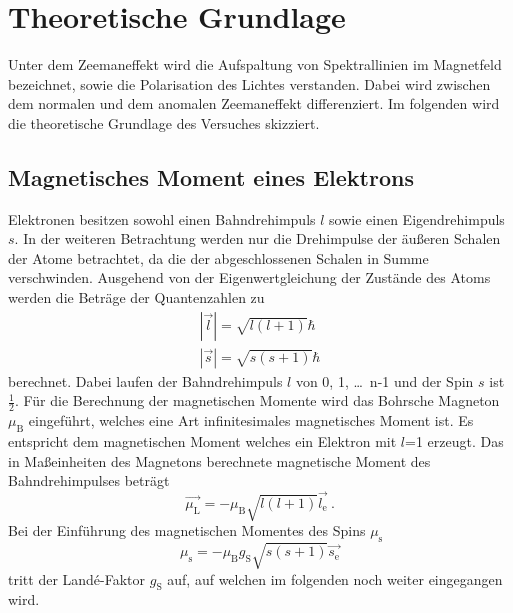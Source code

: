 \section{Theoretische Grundlage}
\label{sec:Theorie}
Unter dem Zeemaneffekt wird die Aufspaltung von Spektrallinien im Magnetfeld bezeichnet, sowie die Polarisation des Lichtes verstanden. Dabei wird zwischen dem normalen und dem anomalen Zeemaneffekt differenziert. Im folgenden wird die theoretische Grundlage des Versuches skizziert.

\subsection{Magnetisches Moment eines Elektrons}
Elektronen besitzen sowohl einen Bahndrehimpuls $l$ sowie einen Eigendrehimpuls $s$. In der weiteren Betrachtung werden nur die Drehimpulse der äußeren Schalen der Atome betrachtet, da die der abgeschlossenen Schalen in Summe verschwinden. Ausgehend von der Eigenwertgleichung der Zustände des Atoms werden die Beträge der Quantenzahlen zu
\begin{eqnarray}
  |\vec{l}| = \sqrt{l(l+1)} \hbar  \\
  |\vec{s}| = \sqrt{s(s+1)} \hbar
  \label{eqn:betQua}
\end{eqnarray}
berechnet. Dabei laufen der Bahndrehimpuls $l$ von 0, 1, \ldots $\,$ n-1 und der Spin $s$ ist $\frac{1}{2}$. Für die Berechnung der magnetischen Momente wird das Bohrsche Magneton $\mu_\text{B}$ eingeführt, welches eine Art infinitesimales magnetisches Moment ist. Es entspricht dem magnetischen Moment welches ein Elektron mit $l$=1 erzeugt. Das in Maßeinheiten des Magnetons berechnete magnetische Moment des Bahndrehimpulses beträgt
\begin{equation}
  \vec{\mu_\text{L}} = -\mu_\text{B} \sqrt{l(l+1)} \vec{l_\text{e}} \ .
  \label{eqn:magL}
\end{equation}
Bei der Einführung des magnetischen Momentes des Spins $\mu_\text{s}$
\begin{equation}
  \mu_\text{s} = - \mu_\text{B} g_\text{S} \sqrt{s(s+1)} \vec{s_\text{e}}
  \label{eqn:magS}
\end{equation}
tritt der Landé-Faktor $g_\text{S}$ auf, auf welchen im folgenden noch weiter eingegangen wird.

